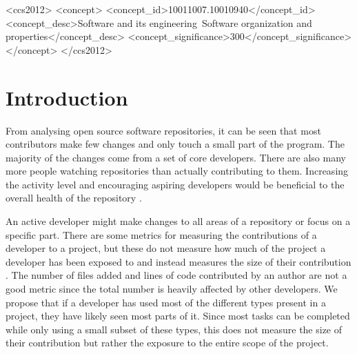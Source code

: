 \documentclass{sig-alternate-05-2015}
\begin{document}
%
%

\begin{CCSXML}
<ccs2012>
<concept>
<concept_id>10011007.10010940</concept_id>
<concept_desc>Software and its engineering~Software organization and properties</concept_desc>
<concept_significance>300</concept_significance>
</concept>
</ccs2012>
\end{CCSXML}



%
%

%
%
\printccsdesc



\section{Introduction}
From analysing open source software repositories, it can be seen that most contributors make few changes and only touch a small part of the program. The majority of the changes come from a set of core developers. There are also many more people watching repositories than actually contributing to them. Increasing the activity level and encouraging aspiring developers would be beneficial to the overall health of the repository \cite{Patrick:Wagstrom:2012}. 

An active developer might make changes to all areas of a repository or focus on a specific part. There are some metrics for measuring the contributions of a developer to a project, but these do not measure how much of the project a developer has been exposed to and instead measures the size of their contribution \cite{KGSP09}. The number of files added and lines of code contributed by an author are not a good metric since the total number is heavily affected by other developers. We propose that if a developer has used most of the different types present in a project, they have likely seen most parts of it. Since most tasks can be completed while only using a small subset of these types, this does not measure the size of their contribution but rather the exposure to the entire scope of the project. 
\end{document}
